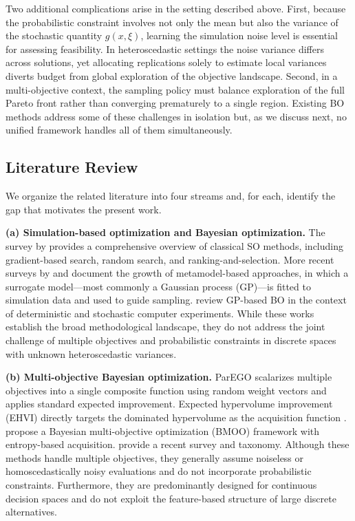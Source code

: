 \documentclass[12pt]{article}
\theoremstyle{plain}
\theoremstyle{definition}
\theoremstyle{remark}
\begin{document}
Two additional complications arise in the setting described above.
First, because the probabilistic constraint involves not only the mean
but also the variance of the stochastic quantity $g(x,\xi)$,
learning the simulation noise level is essential for assessing
feasibility.  In heteroscedastic settings the noise variance differs
across solutions, yet allocating replications solely to estimate local
variances diverts budget from global exploration of the objective
landscape.  Second, in a multi-objective context, the sampling policy
must balance exploration of the full Pareto front rather than
converging prematurely to a single region.  Existing BO methods
address some of these challenges in isolation but, as we discuss next,
no unified framework handles all of them simultaneously.

\subsection{Literature Review}\label{sec:litreview}

We organize the related literature into four streams and, for each,
identify the gap that motivates the present work.

\medskip
\noindent\textbf{(a) Simulation-based optimization and Bayesian
optimization.}
The survey by \citet{Fu2002} provides a comprehensive overview of
classical SO methods, including gradient-based search, random search,
and ranking-and-selection.  More recent surveys by
\citet{Amaran2016} and \citet{Hong2021} document the growth of
metamodel-based approaches, in which a surrogate model---most commonly
a Gaussian process (GP)---is fitted to simulation data and used to
guide sampling.  \citet{Forrester2009} review GP-based BO in the
context of deterministic and stochastic computer experiments.  While
these works establish the broad methodological landscape, they do not
address the joint challenge of multiple objectives and probabilistic
constraints in discrete spaces with unknown heteroscedastic variances.

\medskip
\noindent\textbf{(b) Multi-objective Bayesian optimization.}
ParEGO \citep{Knowles2006} scalarizes multiple objectives into a
single composite function using random weight vectors and applies
standard expected improvement.  Expected hypervolume improvement
(EHVI) directly targets the dominated hypervolume as the acquisition
function \citep{Emmerich2006,Daulton2020}.
\citet{Feliot2017} propose a Bayesian multi-objective optimization
(BMOO) framework with entropy-based acquisition.
\citet{RojasGonzalez2020} provide a recent survey and taxonomy.
Although these methods handle multiple objectives, they generally
assume noiseless or homoscedastically noisy evaluations and do not
incorporate probabilistic constraints.  Furthermore, they are
predominantly designed for continuous decision spaces and do not
exploit the feature-based structure of large discrete alternatives.
\end{document}
